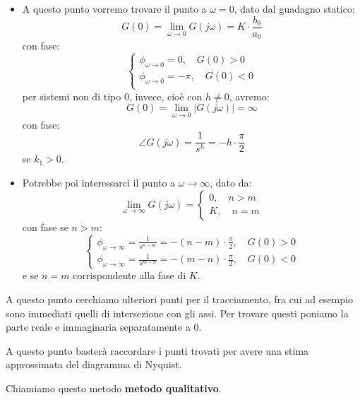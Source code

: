 \documentclass[a4paper,11pt]{article}
\begin{document}
\begin{enumerate}
		\begin{itemize}
			\item 
		A questo punto vorremo trovare il punto a $\omega = 0$, dato dal guadagno statico:
		$$
			G(0) = \lim_{\omega \rightarrow 0} G(j \omega) = K \cdot \frac{b_0}{a_0}
		$$
		con fase:
		\[
			\begin{cases}
				\phi_{\omega \rightarrow 0} = 0, \quad G(0) > 0 \\	
				\phi_{\omega \rightarrow 0} = -\pi, \quad G(0) < 0 \\	
			\end{cases}
		\]
		per sistemi non di tipo $0$, invece, cioè con $h \neq 0$, avremo:
		$$
			G(0) = \lim_{\omega \rightarrow 0} |G(j\omega)| = \infty
		$$
		con fase:
		$$
		\angle G(j\omega) = \frac{1}{s^h} = -h \cdot \frac{\pi}{2}
		$$
		se $k_1 > 0$.
	\item 
		Potrebbe poi interessarci il punto a $\omega \rightarrow \infty$, dato da:
		\[
				\lim_{\omega \rightarrow \infty} G(j\omega) = 	
			\begin{cases}
				0, \quad n > m \\
				K, \quad n = m
			\end{cases}
		\]
		con fase se $n > m$:
		\[
			\begin{cases}
				\phi_{\omega \rightarrow \infty} = \frac{1}{s^{n - m}} = - (n - m) \cdot \frac{\pi}{2}, \quad G(0) > 0 \\
				\phi_{\omega \rightarrow \infty} = \frac{1}{s^{m - n}} = - (m - n) \cdot \frac{\pi}{2}, \quad G(0) < 0
			\end{cases}
		\]
		e se $n = m$ corrispondente alla fase di $K$.
\end{itemize}

A questo punto cerchiamo ulteriori punti per il tracciamento, fra cui ad esempio sono immediati quelli di intersezione con gli assi.
Per trovare questi poniamo la parte reale e immaginaria separatamente a 0.

A questo punto basterà raccordare i punti trovati per avere una stima approssimata del diagramma di Nyquist.

Chiamiamo questo metodo \textbf{metodo qualitativo}.
\end{enumerate}
\end{document}

